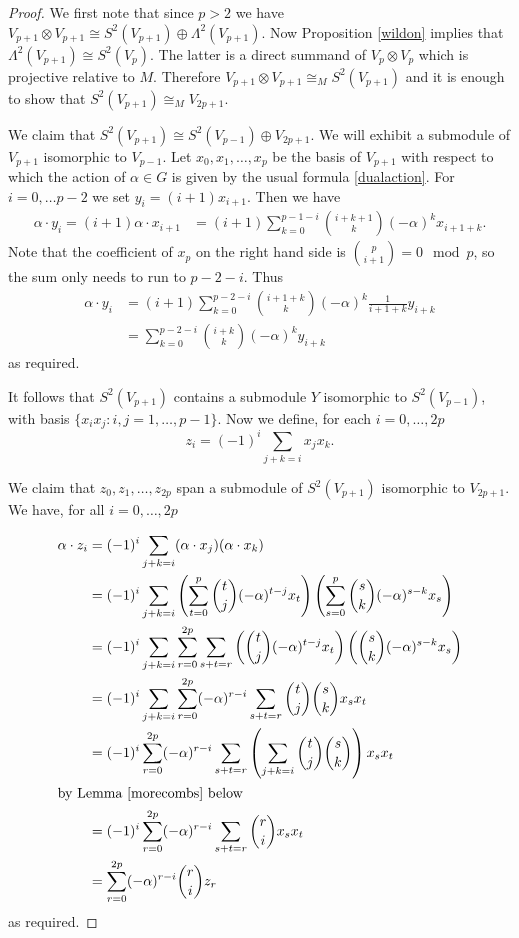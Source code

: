 \documentclass[a4paper]{amsart}
\theoremstyle{definition}
\theoremstyle{remark}
\theoremstyle{Acknowledgments}
\begin{document}
\begin{proof}
We first note that since $p>2$ we have  $V_{p+1} \otimes V_{p+1} \cong S^2(V_{p+1}) \oplus \Lambda^2(V_{p+1})$. Now Proposition \ref{wildon} implies that $ \Lambda^2(V_{p+1}) \cong S^2(V_p)$. The latter is a direct summand of $V_p \otimes V_p$ which is projective relative to $M$. Therefore 
$V_{p+1} \otimes V_{p+1} \cong_M S^2(V_{p+1})$ and it is enough to show that $S^2(V_{p+1}) \cong_M V_{2p+1}$.

We claim that  $S^2(V_{p+1}) \cong S^2(V_{p-1}) \oplus V_{2p+1}$. We will exhibit a submodule of $V_{p+1}$ isomorphic to $V_{p-1}$. Let $x_0, x_1, \ldots, x_{p}$ be the basis of $V_{p+1}$ with respect to which the action of $\alpha \in G$ is given by the usual formula \eqref{dualaction}. For $i=0, \ldots p-2$ we set $y_i = (i+1)x_{i+1}$. Then we have
\begin{align*} \alpha \cdot y_i = (i+1) \alpha \cdot x_{i+1} &= (i+1) \sum_{k=0}^{p-1-i} \binom{i+k+1}{k}(-\alpha)^k x_{i+1+k}. \end{align*}
Note that the coefficient of $x_{p}$ on the right hand side is $\binom{p}{i+1} = 0 \mod p$, so the sum only needs to run to $p-2-i$. Thus 
\begin{align*}\alpha \cdot y_i &=  (i+1) \sum_{k=0}^{p-2-i} \binom{i+1+k}{k}(-\alpha)^k \frac{1}{i+1+k}y_{i+k} \\
&=  \sum_{k=0}^{p-2-i} \binom{i+k}{k}(-\alpha)^k y_{i+k} \end{align*}
as required.

It follows that $S^2(V_{p+1})$ contains a submodule $Y$ isomorphic to $S^2(V_{p-1})$, with basis $\{x_ix_j: i,j = 1, \ldots, p-1\}$.
Now we define, for each $i=0, \ldots, 2p$
\[z_i = (-1)^i \sum_{j+k=i}x_jx_k.\]

We claim that $z_0, z_1, \ldots, z_{2p}$ span a submodule of $S^2(V_{p+1})$ isomorphic to $V_{2p+1}$. 
We have, for all $i=0, \ldots, 2p$

\begin{align*}
\alpha \cdot z_i &= (-1)^i \sum_{j+k=i}(\alpha \cdot x_j)(\alpha \cdot x_k)\\
&= (-1)^i \sum_{j+k=i}\left(\sum_{t=0}^p \binom{t}{j} (-\alpha)^{t-j} x_t \right) \left(\sum_{s=0}^p \binom{s}{k} (-\alpha)^{s-k} x_s \right)\\
&= (-1)^i \sum_{j+k=i} \sum_{r=0}^{2p} \sum_{s+t=r}\left(\binom{t}{j} (-\alpha)^{t-j} x_t \right) \left(\binom{s}{k} (-\alpha)^{s-k} x_s \right)\\
&= (-1)^i \sum_{j+k=i} \sum_{r=0}^{2p} (-\alpha)^{r-i} \sum_{s+t=r} \binom{t}{j}\binom{s}{k}  x_s x_t\\
&= (-1)^i  \sum_{r=0}^{2p} (-\alpha)^{r-i} \sum_{s+t=r}\left(  \sum_{j+k=i} \binom{t}{j}\binom{s}{k} \right)  x_s x_t\\
\intertext{by Lemma \ref{morecombs} below}
&= (-1)^i  \sum_{r=0}^{2p} (-\alpha)^{r-i} \sum_{s+t=r} \binom{r}{i} x_s x_t\\
&=\sum_{r=0}^{2p} (-\alpha)^{r-i} \binom{r}{i} z_r
\end{align*}
as required.


\end{proof}
\end{document}
